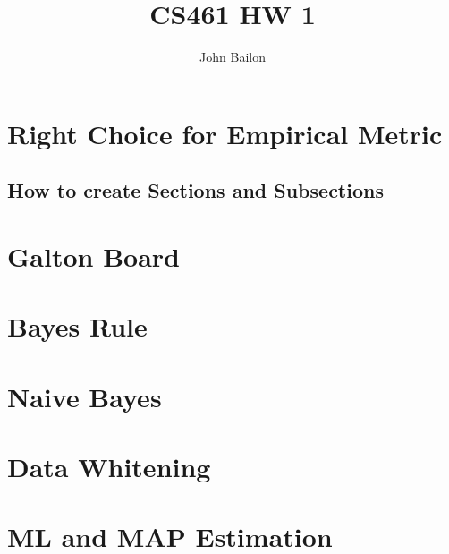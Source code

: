 \documentclass{article}
\title{CS461 HW 1}
\author{John Bailon}
\begin{document}
\maketitle

\section{Right Choice for Empirical Metric}

\subsection{How to create Sections and Subsections}

\section{Galton Board}

\section{Bayes Rule}

\section{Naive Bayes}

\section{Data Whitening}

\section{ML and MAP Estimation}
\end{document}

